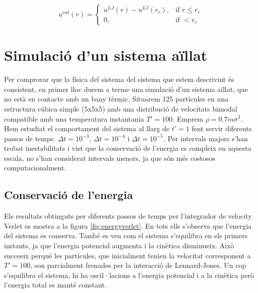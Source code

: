 \documentclass[a4paper,10pt]{article}
\begin{document}
\begin{equation}
	u^{cut}(r) = \left\{ \begin{array}{lcc} u^{LJ}(r) - u^{LJ}(r_c), & \text{if } r \leq r_c \\ 0,  & \text{if } < r_c  \end{array} \right.
\end{equation}	

\section{Simulació d'un sistema aïllat}
Per comprovar que la física del sistema del sistema que estem descrivint és consistent, en primer lloc durem a terme una simulació d'un sistema aïllat, que no està en contacte amb un bany tèrmic. Situarem 125 partícules en una estructura cúbica simple (5x5x5) amb una distribució de velocitats bimodal compatible amb una temperatura instantania $T'=100$. Emprem  $\rho = 0.7 m\sigma^3$. Hem estudiat el comportament del sistema al llarg de $t' = 1$ fent servir diferents passos de temps: $\Delta t = 10^{-3}$, $\Delta t = 10^{-4}$ i $\Delta t = 10^{-5}$. Per intervals majors s'han trobat inestabilitats i vist que la conservació de l'energia es compleix en aquesta escala, no s'han considerat intervals menors, ja que són més costosos computacionalment. 

\subsection{Conservació de l'energia}

Els resultats obtinguts per diferents passos de temps per l'integrador de velocity Verlet es mostra a la figura \ref{fig:energyverlet}. En tots ells s'observa que l'energia del sistema es conserva. També es veu com el sistema s'equilibra en els primers instants, ja que l'energia potencial augmenta i la cinètica disminueix. Això succeeix perquè les partícules, que inicialment tenien la velocitat corresponent a $T'=100$, son parcialment frenades per la interacció de Lennard-Jones. Un cop s'equilibra el sistema, hi ha oscil·lacions a l'energia potencial i a la cinètica però l'energia total es manté constant. 
\end{document}
